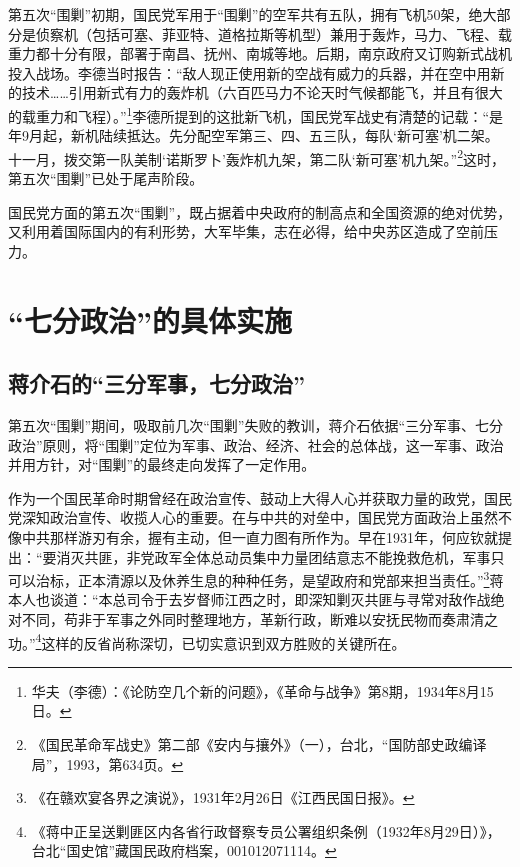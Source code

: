 第五次“围剿”初期，国民党军用于“围剿”的空军共有五队，拥有飞机50架，绝大部分是侦察机（包括可塞、菲亚特、道格拉斯等机型）兼用于轰炸，马力、飞程、载重力都十分有限，部署于南昌、抚州、南城等地。后期，南京政府又订购新式战机投入战场。李德当时报告：“敌人现正使用新的空战有威力的兵器，并在空中用新的技术……引用新式有力的轰炸机（六百匹马力不论天时气候都能飞，并且有很大的载重力和飞程）。”\footnote{华夫（李德）：《论防空几个新的问题》，《革命与战争》第8期，1934年8月15日。}李德所提到的这批新飞机，国民党军战史有清楚的记载：“是年9月起，新机陆续抵达。先分配空军第三、四、五三队，每队‘新可塞’机二架。十一月，拨交第一队美制‘诺斯罗卜’轰炸机九架，第二队‘新可塞’机九架。”\footnote{《国民革命军战史》第二部《安内与攘外》（一），台北，“国防部史政编译局”，1993，第634页。}这时，第五次“围剿”已处于尾声阶段。


国民党方面的第五次“围剿”，既占据着中央政府的制高点和全国资源的绝对优势，又利用着国际国内的有利形势，大军毕集，志在必得，给中央苏区造成了空前压力。

\section{“七分政治”的具体实施}

\subsection{蒋介石的“三分军事，七分政治”}


第五次“围剿”期间，吸取前几次“围剿”失败的教训，蒋介石依据“三分军事、七分政治”原则，将“围剿”定位为军事、政治、经济、社会的总体战，这一军事、政治并用方针，对“围剿”的最终走向发挥了一定作用。


作为一个国民革命时期曾经在政治宣传、鼓动上大得人心并获取力量的政党，国民党深知政治宣传、收揽人心的重要。在与中共的对垒中，国民党方面政治上虽然不像中共那样游刃有余，握有主动，但一直力图有所作为。早在1931年，何应钦就提出：“要消灭共匪，非党政军全体总动员集中力量团结意志不能挽救危机，军事只可以治标，正本清源以及休养生息的种种任务，是望政府和党部来担当责任。”\footnote{《在赣欢宴各界之演说》，1931年2月26日《江西民国日报》。}蒋本人也谈道：“本总司令于去岁督师江西之时，即深知剿灭共匪与寻常对敌作战绝对不同，苟非于军事之外同时整理地方，革新行政，断难以安抚民物而奏肃清之功。”\footnote{《蒋中正呈送剿匪区内各省行政督察专员公署组织条例（1932年8月29日）》，台北“国史馆”藏国民政府档案，001012071114。}这样的反省尚称深切，已切实意识到双方胜败的关键所在。


